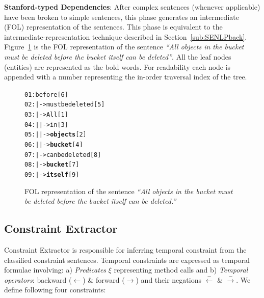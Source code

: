 \textbf{Stanford-typed Dependencies}: After complex sentences (whenever applicable) have been broken to simple sentences, this phase generates an intermediate (FOL) representation of the sentences. This phase is equivalent to the intermediate-representation technique described in Section~\ref{sub:SENLPback}. Figure~\ref{fig:FOLTree} is the FOL representation of the sentence  \textit{``All objects in the bucket must be deleted before the bucket itself can be deleted''}. All the leaf nodes (entities) are represented as the bold words. For readability each node is appended with a number representing the in-order traversal index of the tree. 

\begin{figure}
	\begin{CodeOut}
		\begin{alltt}
			01:before[6]
			02:|->must be deleted[5]
			03:\hspace*{0.2in}|->All[1]
			04:\hspace*{0.2in}|\hspace*{0.2in}|->in[3]
			05:\hspace*{0.2in}|\hspace*{0.4in}|->\textbf{objects}[2]
			06:\hspace*{0.2in}|\hspace*{0.4in}|->\textbf{bucket}[4]
			07:\hspace*{0.2in}|->can be deleted[8]
			08:\hspace*{0.4in}|->\textbf{bucket}[7]
			09:\hspace*{0.4in}|->\textbf{itself}[9]
		\end{alltt}
	\end{CodeOut}
	\caption{\label{fig:FOLTree} FOL representation of the sentence \textit{``All objects in the bucket must be deleted before the bucket itself can be deleted.''}}
\end{figure}

\subsection{Constraint Extractor}
\label{sub:ConsExtract}

Constraint Extractor is responsible for inferring temporal constraint from the classified constraint sentences. Temporal constraints are expressed as temporal formulae involving: a) \textit{Predicates} $\xi$ representing method calls and b) \textit{Temporal operators}: backward ($\leftarrow$) \& forward ($\rightarrow$) and their negations $\xleftarrow{-}$ \& $\xrightarrow{-}$. We define following four constraints:

